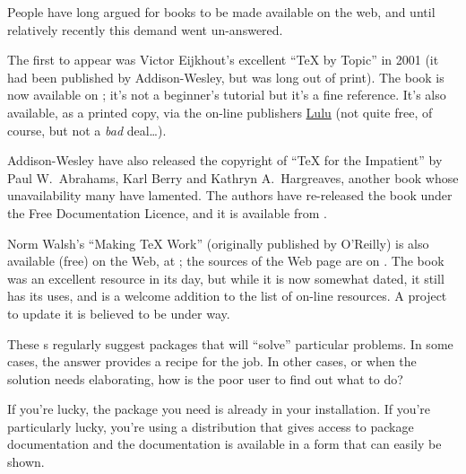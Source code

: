 
People have long argued for \AllTeX{} books to be made available on
the web, and until relatively recently this demand went un-answered.

The first to appear was Victor Eijkhout's excellent ``\TeX{} by
Topic'' in 2001 (it had been published by Addison-Wesley, but was long
out of print).  The book is now available on ; it's not a
beginner's tutorial but it's a fine reference.  It's also available,
as a printed copy, via the on-line publishers
\href{http://www.lulu.com/content/2555607/}{Lulu} (not quite free, of
course, but not a \emph{bad} deal\dots{}).

Addison-Wesley have also released the copyright of ``\TeX{} for the
Impatient'' by Paul W.~Abrahams, Karl Berry and Kathryn A.~Hargreaves,
another book whose unavailability many have lamented.  The authors
have re-released the book under the  Free Documentation
Licence, and it is available from .

Norm Walsh's ``Making \TeX{} Work'' (originally published by O'Reilly)
is also available (free) on the Web, at
; the sources of the
Web page are on .  The book was an excellent resource in
its day, but while it is now somewhat dated, it still has its uses,
and is a welcome addition to the list of on-line resources.  A project
to update it is believed to be under way.
\begin{ctanrefs}
\item[\nothtml{\rmfamily}Making \TeX{} Work]
\item[\nothtml{\rmfamily}\TeX{} by Topic]
\item[\nothtml{\rmfamily}\TeX{} for the Impatient]
\end{ctanrefs}


These s regularly suggest packages that will ``solve''
particular problems.  In some cases, the answer provides a recipe for
the job.  In other cases, or when the solution needs elaborating, how
is the poor user to find out what to do?

If you're lucky, the package you need is already in your installation.
If you're particularly lucky, you're using a distribution that gives
access to package documentation and the documentation is available in
a form that can easily be shown.

